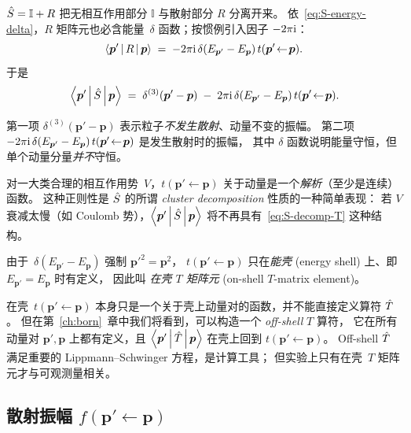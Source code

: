 $\hat{S} = \mathbb{I} + R$ 把无相互作用部分 $\mathbb{I}$ 与散射部分 $R$ 分离开来。
依~\eqref{eq:S-energy-delta}，$R$ 矩阵元也必含能量~$\delta$ 函数；按惯例引入因子 $-2\pi\mathrm{i}$：
\begin{equation}
\left\langle \bm{p}' \,\middle|\, R \,\middle|\, \bm{p} \right\rangle \;=\; -2\pi\mathrm{i}\,\delta(E_{\bm{p}'}-E_{\bm{p}})\,t(\bm{p}'\!\leftarrow\!\bm{p}).
\label{eq:R-T}
\end{equation}
于是
\begin{equation}
\left\langle \bm{p}' \,\middle|\, \hat{S} \,\middle|\, \bm{p} \right\rangle \;=\; \delta^{(3)}(\bm{p}'-\bm{p}) \;-\; 2\pi\mathrm{i}\,\delta(E_{\bm{p}'}-E_{\bm{p}})\,t(\bm{p}'\!\leftarrow\!\bm{p}).
\label{eq:S-decomp-T}
\end{equation}

第一项 $\delta^{(3)}(\bm{p}'-\bm{p})$ 表示粒子\emph{不发生散射}、动量不变的振幅。
第二项 $-2\pi\mathrm{i}\,\delta(E_{\bm{p}'}-E_{\bm{p}})\,t(\bm{p}'\!\leftarrow\!\bm{p})$ 是发生散射时的振幅，
其中 $\delta$ 函数说明能量守恒，但单个动量分量\emph{并不}守恒。

\begin{remark}
对一大类合理的相互作用势~$V$，$t(\bm{p}'\!\leftarrow\!\bm{p})$ 关于动量是一个\emph{解析}（至少是连续）函数。
这种正则性是 $\hat{S}$ 的所谓 \emph{cluster decomposition} 性质的一种简单表现：
若 $V$ 衰减太慢（如 Coulomb 势），$\left\langle \bm{p}' \,\middle|\, \hat{S} \,\middle|\, \bm{p} \right\rangle$ 将不再具有~\eqref{eq:S-decomp-T} 这种结构。
\end{remark}

由于~$\delta(E_{\bm{p}'}-E_{\bm{p}})$ 强制 $\bm{p}'^2 = \bm{p}^2$，
$t(\bm{p}'\!\leftarrow\!\bm{p})$ 只在\emph{能壳} (energy shell) 上、即 $E_{\bm{p}'} = E_{\bm{p}}$ 时有定义，
因此叫 \emph{在壳 $T$ 矩阵元} (on-shell $T$-matrix element)。

\begin{remark}
在壳~$t(\bm{p}'\!\leftarrow\!\bm{p})$ 本身只是一个关于壳上动量对的函数，并不能直接定义算符 $\hat{T}$。
但在第~\ref{ch:born}~章中我们将看到，可以构造一个 \emph{off-shell} $T$ 算符，
它在所有动量对 $\bm{p}', \bm{p}$ 上都有定义，且 $\left\langle \bm{p}' \,\middle|\, \hat{T} \,\middle|\, \bm{p} \right\rangle$ 在壳上回到 $t(\bm{p}'\!\leftarrow\!\bm{p})$。
Off-shell $\hat{T}$ 满足重要的 Lippmann--Schwinger 方程，是计算工具；
但实验上只有在壳~$T$ 矩阵元才与可观测量相关。
\end{remark}

\subsection{散射振幅 $f(\bm{p}'\!\leftarrow\!\bm{p})$}

